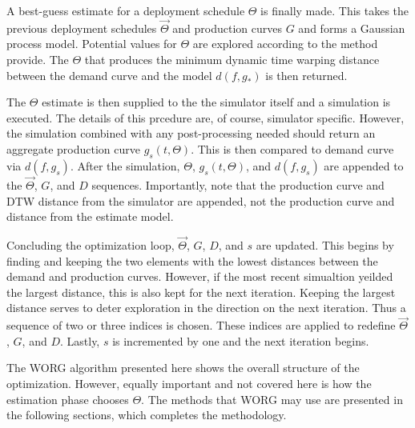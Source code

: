 A best-guess estimate for a deployment schedule $\Theta$ is finally 
made.  This takes the previous deployment schedules $\vec{\Theta}$ and
production curves $G$ and forms a Gaussian process model. Potential 
values for $\Theta$ are explored according to the method provide.  The 
$\Theta$ that produces the minimum dynamic time warping distance between
the demand curve and the model $d(f, g_*)$ is then returned.

The $\Theta$ estimate is then supplied to the the simulator itself and 
a simulation is executed.  The details of this prcedure are, of course,
simulator specific.  However, the simulation combined with any post-processing 
needed should return an aggregate production curve $g_s(t, \Theta)$.  
This is then compared to demand curve via $d(f, g_s)$. After the simulation, 
$\Theta$, $g_s(t, \Theta)$, and $d(f, g_s)$ are appended to the 
$\vec{\Theta}$, $G$, and $D$ sequences.  Importantly, note that the 
production curve and DTW distance from the simulator are appended, 
not the production curve and distance from the estimate model.

Concluding the optimization loop, $\vec{\Theta}$, $G$, $D$, and $s$ are
updated.  This begins by finding and keeping the two elements with the 
lowest distances between the demand and production curves.  However, 
if the most recent simualtion yeilded the largest distance, this is also
kept for the next iteration. Keeping the largest distance serves to deter
exploration in the direction on the next iteration.  Thus a sequence of 
two or three indices is chosen. These indices are applied to redefine
$\vec{\Theta}$, $G$, and $D$. Lastly, $s$ is incremented by one and the
next iteration begins.

The WORG algorithm presented here shows the overall structure of the 
optimization.  However, equally important and not covered here is how the
estimation phase chooses $\Theta$.  The methods that WORG may use are 
presented in the following sections, which completes the methodology. 